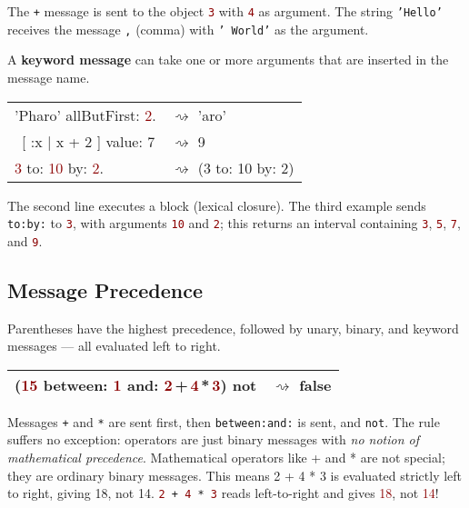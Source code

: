 \documentclass[notumble]{leaflet}
\newcommand{\code}[1]{\foreignlanguage{english}{\texttt{#1}}}
\begin{document}
The \code{+} message is sent to the object
\textcolor{darkRed}{\code{3}} with \textcolor{darkRed}{\code{4}} as
 argument. The string \textcolor{string}{\code{'Hello'}} receives the message \code{,}
(comma) with \textcolor{string}{\code{'~World'}} as the argument.

A \textbf{keyword message} can take one or more
arguments that are inserted in the message name.

\noindent
\begin{tabularx}{\linewidth}{@{}lX@{}}
        \toprule
     \textcolor{string}{'Pharo'} allButFirst: \textcolor{darkRed}{2}.& $\rightsquigarrow$ 'aro' \\
\ [ :x | x + 2 ] value: 7 & $\rightsquigarrow$ 9 \\
     \textcolor{darkRed}{3} to: \textcolor{darkRed}{10} by: \textcolor{darkRed}{2}.& $\rightsquigarrow$ (3 to: 10 by: 2)\\
       \midrule
\end{tabularx}

The second line executes a block (lexical closure). 
The third example sends
\code{to:by:} to \textcolor{darkRed}{\code{3}}, with arguments
\textcolor{darkRed}{\code{10}} and \textcolor{darkRed}{\code{2}}; this
returns an interval containing \textcolor{darkRed}{\code{3}},
\textcolor{darkRed}{\code{5}}, \textcolor{darkRed}{\code{7}}, and
\textcolor{darkRed}{\code{9}}. 

\vspace{-0.3cm}
\subsection{Message Precedence}

Parentheses have the highest precedence, followed by unary, binary, and keyword messages — all evaluated left to right. 

\noindent
\begin{tabularx}{\linewidth}{@{}lX@{}}
        \toprule
    (\textcolor{darkRed}{15} between: \textcolor{darkRed}{1} and: \textcolor{darkRed}{2}\,+\,\textcolor{darkRed}{4}\,*\,\textcolor{darkRed}{3}) not& $\rightsquigarrow$ false \\
       \midrule
\end{tabularx}



Messages \code{+} and \code{*} are sent first, then \code{between:and:} is sent, and \code{not}.
The rule suffers no exception: operators are just binary messages with \emph{no notion of mathematical precedence}.
Mathematical operators like + and * are not special; they are ordinary binary messages.  This means 2 + 4 * 3 is evaluated strictly left to right, giving 18, not 14. 
\code{\textcolor{darkRed}{2}\,+\,\textcolor{darkRed}{4}\,*\,\textcolor{darkRed}{3}} reads left-to-right and gives \textcolor{darkRed}{18}, not \textcolor{darkRed}{14}!
\end{document}
